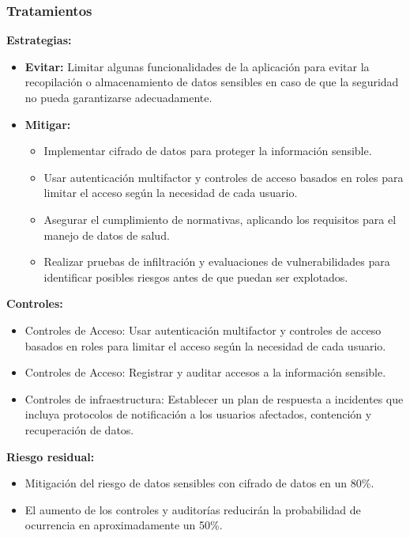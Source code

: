 \documentclass[a4paper,12pt]{article}
\begin{document}
    \subsubsection{Tratamientos}
    \par \textbf{Estrategias:}
    \begin{itemize}
        \item \textbf{Evitar:} Limitar algunas funcionalidades de la aplicación para evitar la recopilación o almacenamiento de datos sensibles en caso de que la seguridad no pueda garantizarse adecuadamente.
        \item \textbf{Mitigar:}
        \begin{itemize}
            \item Implementar cifrado de datos para proteger la información sensible.
            \item Usar autenticación multifactor y controles de acceso basados en roles para limitar el acceso según la necesidad de cada usuario. 
            \item Asegurar el cumplimiento de normativas, aplicando los requisitos para el manejo de datos de salud. 
            \item Realizar pruebas de infiltración y evaluaciones de vulnerabilidades para identificar posibles riesgos antes de que puedan ser explotados.
        \end{itemize} 
    \end{itemize}
    \par \textbf{Controles:}
    \begin{itemize}
        \item Controles de Acceso: Usar autenticación multifactor y controles de acceso basados en roles para limitar el acceso según la necesidad de cada usuario.
        \item Controles de Acceso: Registrar y auditar accesos a la información sensible.
        \item Controles de infraestructura: Establecer un plan de respuesta a incidentes que incluya protocolos de notificación a los usuarios afectados, contención y recuperación de datos.
    \end{itemize}
    \par \textbf{Riesgo residual:}
    \begin{itemize}
        \item Mitigación del riesgo de datos sensibles con cifrado de datos en un 80\%.
        \item El aumento de los controles y auditorías reducirán la probabilidad de ocurrencia en aproximadamente un 50\%.
    \end{itemize}
\end{document}
